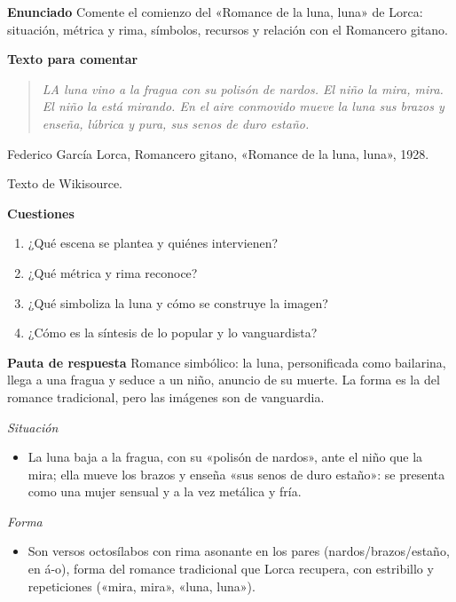 \documentclass{book}
\begin{document}
\begin{tcolorbox}[title={Ejercicio resuelto}, studiumworked, breakable]

\noindent\textbf{Enunciado}
Comente el comienzo del «Romance de la luna, luna» de Lorca: situación, métrica y rima, símbolos, recursos y relación con el Romancero gitano.


\noindent\textbf{Texto para comentar}

\begin{quote}
\itshape LA luna vino a la fragua con su polisón de nardos. El niño la mira, mira. El niño la está mirando. En el aire conmovido mueve la luna sus brazos y enseña, lúbrica y pura, sus senos de duro estaño.
\end{quote}
{\noindent\footnotesize Federico García Lorca, Romancero gitano, «Romance de la luna, luna», 1928.\par}
{\noindent\footnotesize Texto de Wikisource.\par}

\noindent\textbf{Cuestiones}
\begin{enumerate}
\item ¿Qué escena se plantea y quiénes intervienen?
\item ¿Qué métrica y rima reconoce?
\item ¿Qué simboliza la luna y cómo se construye la imagen?
\item ¿Cómo es la síntesis de lo popular y lo vanguardista?
\end{enumerate}

\noindent\textbf{Pauta de respuesta}
Romance simbólico: la luna, personificada como bailarina, llega a una fragua y seduce a un niño, anuncio de su muerte. La forma es la del romance tradicional, pero las imágenes son de vanguardia.


\noindent\textit{Situación}
\begin{itemize}
\item La luna baja a la fragua, con su «polisón de nardos», ante el niño que la mira; ella mueve los brazos y enseña «sus senos de duro estaño»: se presenta como una mujer sensual y a la vez metálica y fría.
\end{itemize}

\noindent\textit{Forma}
\begin{itemize}
\item Son versos octosílabos con rima asonante en los pares (nardos/brazos/estaño, en á-o), forma del romance tradicional que Lorca recupera, con estribillo y repeticiones («mira, mira», «luna, luna»).
\end{itemize}


\end{tcolorbox}
\end{document}
